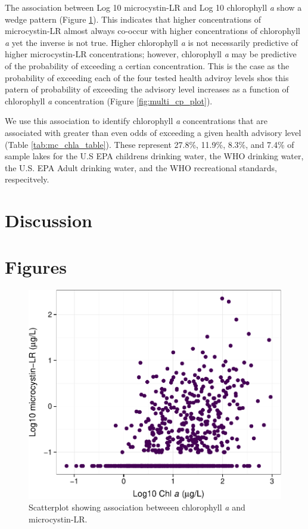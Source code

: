 \documentclass[11pt,]{article}
\begin{document}
The association between Log 10 microcystin-LR and Log 10 chlorophyll
\emph{a} show a wedge pattern (Figure \ref{fig:chla_micro_scatter}).
This indicates that higher concentrations of microcystin-LR almost
always co-occur with higher concentrations of chlorophyll \emph{a} yet
the inverse is not true. Higher chlorophyll \emph{a} is not necessarily
predictive of higher microcystin-LR concentrations; however, chlorophyll
\emph{a} may be predictive of the probability of exceeding a certian
concentration. This is the case as the probability of exceeding each of
the four tested health adviroy levels shos this patern of probability of
exceeding the advisory level increases as a function of chlorophyll
\emph{a} concentration (Figure \ref{fig:multi_cp_plot}).

We use this association to identify chlorophyll \emph{a} concentrations
that are associated with greater than even odds of exceeding a given
health advisory level (Table \ref{tab:mc_chla_table}). These represent
27.8\%, 11.9\%, 8.3\%, and 7.4\% of sample lakes for the U.S EPA
childrens drinking water, the WHO drinking water, the U.S. EPA Adult
drinking water, and the WHO recreational standards, respecitvely.

\section{Discussion}\label{discussion}

\newpage

\section{Figures}\label{figures}

\begin{figure}[htbp]
\centering
\includegraphics{manuscript_files/figure-latex/chla_micro_scatter-1.pdf}
\caption{Scatterplot showing association betweeen chlorophyll \textit{a}
and microcystin-LR. \label{fig:chla_micro_scatter}}
\end{figure}
\end{document}
